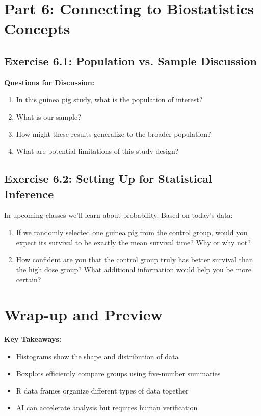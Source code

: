 \documentclass[11pt]{article}
\begin{document}
\section{Part 6: Connecting to Biostatistics Concepts}

\subsection{Exercise 6.1: Population vs. Sample Discussion}

\textbf{Questions for Discussion:}
\begin{enumerate}
\item In this guinea pig study, what is the population of interest?
\item What is our sample?
\item How might these results generalize to the broader population?
\item What are potential limitations of this study design?
\end{enumerate}

\subsection{Exercise 6.2: Setting Up for Statistical Inference}

In upcoming classes we'll learn about probability. Based on today's data:

\begin{enumerate}
\item If we randomly selected one guinea pig from the control group, would you expect its survival to be exactly the mean survival time? Why or why not?

\item How confident are you that the control group truly has better survival than the high dose group? What additional information would help you be more certain?
\end{enumerate}

\section{Wrap-up and Preview}

\textbf{Key Takeaways:}
\begin{itemize}
\item Histograms show the shape and distribution of data
\item Boxplots efficiently compare groups using five-number summaries
\item R data frames organize different types of data together
\item AI can accelerate analysis but requires human verification
\end{itemize}
\end{document}
